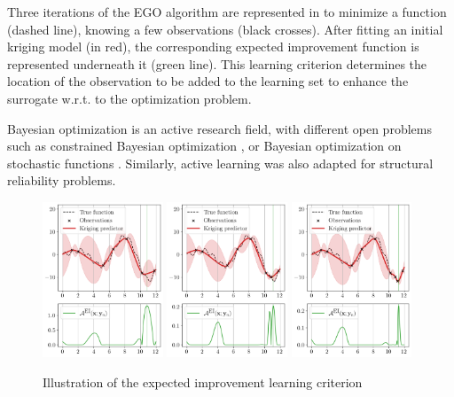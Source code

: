 Three iterations of the EGO algorithm are represented in  to minimize a function (dashed line), knowing a few observations (black crosses). 
After fitting an initial kriging model (in red), the corresponding expected improvement function is represented underneath it (green line).  
This learning criterion determines the location of the observation to be added to the learning set to enhance the surrogate w.r.t. to the optimization problem. 

Bayesian optimization is an active research field, with different open problems such as constrained Bayesian optimization \citep{petit_2022}, or Bayesian optimization on stochastic functions \citep{gramacy_2020_book}. 
Similarly, active learning was also adapted for structural reliability problems. 

\begin{figure}[ht]
    \centering
    \includegraphics[width=0.32\textwidth]{../numerical_experiments/chapter1/figures/bayesian_opt_0.png}
    \includegraphics[width=0.32\textwidth]{../numerical_experiments/chapter1/figures/bayesian_opt_1.png}
    \includegraphics[width=0.32\textwidth]{../numerical_experiments/chapter1/figures/bayesian_opt_2.png}
    \caption{Illustration of the expected improvement learning criterion}
    \label{fig:EGO_1D}
\end{figure}

